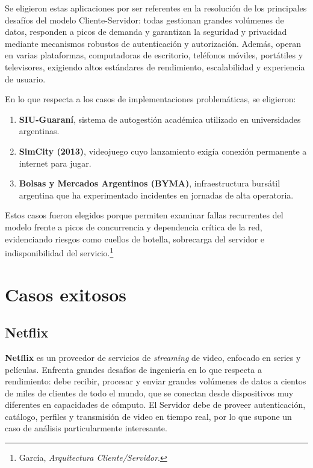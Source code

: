 \documentclass[
  spanish,
  11pt,
]{article}
\providecommand{\tightlist}{%
  \setlength{\itemsep}{0pt}\setlength{\parskip}{0pt}}
\begin{document}
Se eligieron estas aplicaciones por ser referentes en la resolución de
los principales desafíos del modelo Cliente-Servidor: todas gestionan
grandes volúmenes de datos, responden a picos de demanda y garantizan la
seguridad y privacidad mediante mecanismos robustos de autenticación y
autorización. Además, operan en varias plataformas, computadoras de
escritorio, teléfonos móviles, portátiles y televisores, exigiendo altos
estándares de rendimiento, escalabilidad y experiencia de usuario.

En lo que respecta a los casos de implementaciones problemáticas, se
eligieron:

\begin{enumerate}
\def\labelenumi{\arabic{enumi}.}
\tightlist
\item
  \textbf{SIU-Guaraní}, sistema de autogestión académica utilizado en
  universidades argentinas.
\item
  \textbf{SimCity (2013)}, videojuego cuyo lanzamiento exigía conexión
  permanente a internet para jugar.
\item
  \textbf{Bolsas y Mercados Argentinos (BYMA)}, infraestructura bursátil
  argentina que ha experimentado incidentes en jornadas de alta
  operatoria.
\end{enumerate}

Estos casos fueron elegidos porque permiten examinar fallas recurrentes
del modelo frente a picos de concurrencia y dependencia crítica de la
red, evidenciando riesgos como cuellos de botella, sobrecarga del
servidor e indisponibilidad del servicio.\footnote{García,
  \emph{Arquitectura Cliente/Servidor}.}

\section{Casos exitosos}\label{casos-exitosos}

\subsection{Netflix}\label{netflix}

\textbf{Netflix} es un proveedor de servicios de \emph{streaming} de
video, enfocado en series y películas. Enfrenta grandes desafíos de
ingeniería en lo que respecta a rendimiento: debe recibir, procesar y
enviar grandes volúmenes de datos a cientos de miles de clientes de todo
el mundo, que se conectan desde dispositivos muy diferentes en
capacidades de cómputo. El Servidor debe de proveer autenticación,
catálogo, perfiles y transmisión de video en tiempo real, por lo que
supone un caso de análisis particularmente interesante.
\end{document}
